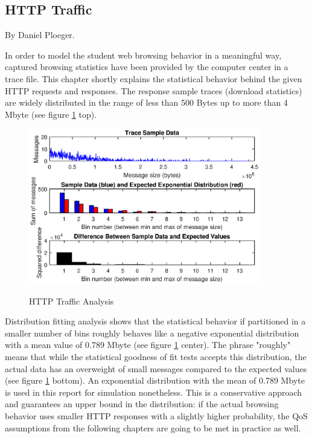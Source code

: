 \documentclass[a4paper,10pt]{book}\usepackage{graphicx}
\begin{document}
\subsection{HTTP Traffic}
\label{chapter_http_traffic}
By Daniel Ploeger.

In order to model the student web browsing behavior in 
a meaningful way, captured browsing statistics have been provided by the computer center in a trace file. 
This chapter shortly explains the statistical behavior behind the given HTTP 
requests and responses. The response sample traces (download statistics) are widely 
distributed in the range of less than 500 Bytes up to more than 4 Mbyte 
(see figure \ref{fig:trace} top).
\begin{figure}[!ht]
  \centering
    \includegraphics[width=0.9\textwidth]{trace_distribution.eps}
    \label{fig:trace}
    \caption{HTTP Traffic Analysis}
\end{figure}

Distribution fitting analysis shows that the statistical behavior if
 partitioned in a smaller number of bins roughly behaves like a negative 
exponential distribution with a mean value of 0.789 Mbyte (see figure \ref{fig:trace} center). 
The phrase "roughly" means that while the statistical goodness of fit tests accepts
 this distribution, the actual data has an overweight of small messages compared to
 the expected values (see figure \ref{fig:trace} bottom). An exponential distribution with the
 mean of 0.789 Mbyte is used in this report for simulation nonetheless. 
This is a conservative approach and guarantees an upper bound in the distribution:
 if the actual browsing behavior uses smaller HTTP responses with a slightly higher
 probability, the QoS assumptions from the following chapters are going to be met 
in practice as well.
\end{document}

